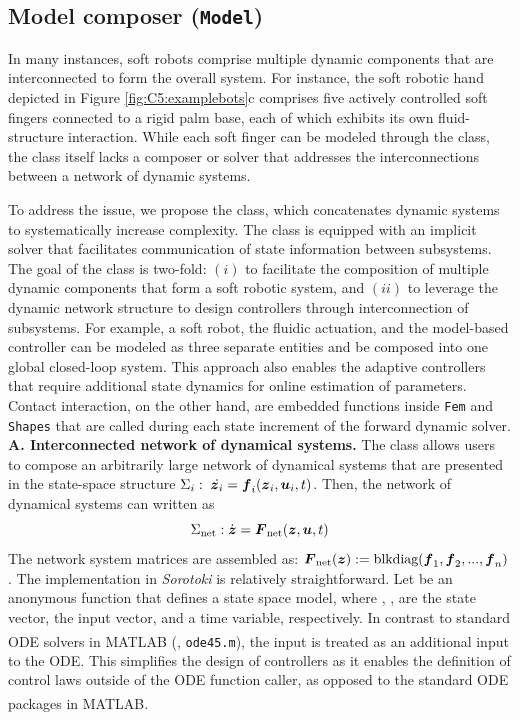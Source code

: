 \subsection{Model composer (\texttt{Model})}
\label{sec:C5:model}
In many instances, soft robots comprise multiple dynamic components that are interconnected to form the overall system. For instance, the soft robotic hand depicted in Figure \ref{fig:C5:examplebots}c comprises five actively controlled soft fingers connected to a rigid palm base, each of which exhibits its own fluid-structure interaction. While each soft finger can be modeled through the  class, the class itself lacks a composer or solver that addresses the interconnections between a network of dynamic systems.

To address the issue, we propose the  class, which concatenates dynamic systems to systematically increase complexity. The class is equipped with an implicit solver that facilitates communication of state information between subsystems. The goal of the  class is two-fold: $(i)$ to facilitate the composition of multiple dynamic components that form a soft robotic system, and $(ii)$ to leverage the dynamic network structure to design controllers through interconnection of subsystems.
For example, a soft robot, the fluidic actuation, and the model-based controller can be modeled as three separate entities and be composed into one global closed-loop system. This approach also enables the adaptive controllers that require additional state dynamics for online estimation of parameters. Contact interaction, on the other hand, are embedded functions inside \texttt{Fem} and \texttt{Shapes} that are called during each state increment of the forward dynamic solver. \\

\textbf{A. Interconnected network of dynamical systems.} The class  allows users to compose an arbitrarily large network of dynamical systems that are presented in the state-space structure $\Sigma_i:\; \dot{{\boldsymbol{z}}_i} = {\boldsymbol{f}}_{i}({\boldsymbol{z}}_i, {\boldsymbol{u}}_i, t)$. Then, the network of dynamical systems can written as
%
\begin{equation}
    \Sigma_{\textrm{net}}: \dot{{\boldsymbol{z}}} = {\boldsymbol{F}}_{\textrm{net}}({\boldsymbol{z}}, {\boldsymbol{u}}, t)
    \label{eq:C5:dynamicnetwork}
\end{equation}
%
The network system matrices are assembled as: ${\boldsymbol{F}}_{\textrm{net}}({\boldsymbol{z}}) := \textrm{blkdiag}({\boldsymbol{f}}_{1},{\boldsymbol{f}}_{2},...,{\boldsymbol{f}}_{n})$. The implementation in \textit{Sorotoki} is relatively straightforward. Let  be an anonymous function that defines a state space model, where , ,  are the state vector, the input vector, and a time variable, respectively. In contrast to standard ODE solvers in {MATLAB}\textsuperscript{\scriptsize\textregistered} (\eg, \texttt{ode45.m}), the input  is treated as an additional input to the ODE. This simplifies the design of controllers as it enables the definition of control laws outside of the ODE function caller, as opposed to the standard ODE packages in {MATLAB}\textsuperscript{\scriptsize\textregistered}.


